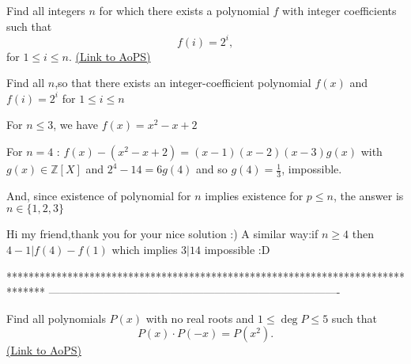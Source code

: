 \begin{problem}
	Find all integers $ n$ for which there exists a polynomial $f$ with integer coefficients such that \[ f(i)=2^i,\] for $ 1\le i\le n$.
	\flushright \href{https://artofproblemsolving.com/community/c6h318073}{(Link to AoPS)}
\end{problem}



\begin{solution}
	\begin{tcolorbox}Find all $ n$,so that there exists an integer-coefficient polynomial $ f(x)$ and $ f(i) = 2^i$ for $ 1\le i\le n$\end{tcolorbox}

For $ n\le 3$, we have $ f(x)=x^2-x+2$

For $ n=4$ : $ f(x)-(x^2-x+2)=(x-1)(x-2)(x-3)g(x)$ with $ g(x)\in\mathbb Z[X]$ and $ 2^4-14=6g(4)$ and so $ g(4)=\frac 13$, impossible.

And, since existence of polynomial for $ n$ implies existence for $ p\le n$, the answer is $ \boxed{n\in\{1,2,3\}}$
\end{solution}



\begin{solution}
	Hi my friend,thank you for your nice solution :) 
A similar way:if $ n\ge 4$ then $ 4-1|f(4)-f(1)$ which implies $ 3|14$ impossible :D
\end{solution}
*******************************************************************************
-------------------------------------------------------------------------------

\begin{problem}
	Find all polynomials $P(x)$ with no real roots and $ 1 \le \deg P \le 5$ such that
\[ P(x) \cdot P(-x) = P(x^2).\]
	\flushright \href{https://artofproblemsolving.com/community/c6h320959}{(Link to AoPS)}
\end{problem}



